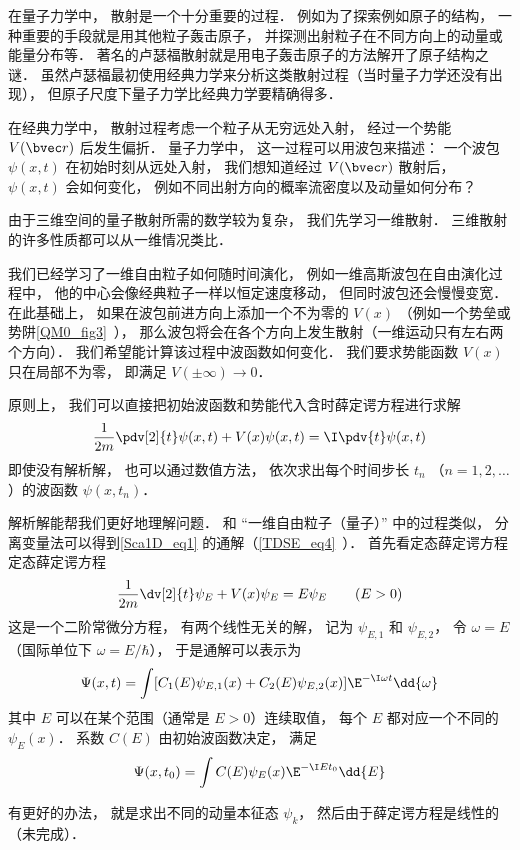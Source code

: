 
\begin{issues}
\issueDraft
\end{issues}


在量子力学中， 散射是一个十分重要的过程． 例如为了探索例如原子的结构， 一种重要的手段就是用其他粒子轰击原子， 并探测出射粒子在不同方向上的动量或能量分布等． 著名的卢瑟福散射就是用电子轰击原子的方法解开了原子结构之谜． 虽然卢瑟福最初使用经典力学来分析这类散射过程（当时量子力学还没有出现）， 但原子尺度下量子力学比经典力学要精确得多．

在经典力学中， 散射过程考虑一个粒子从无穷远处入射， 经过一个势能 $V(\bvec r)$ 后发生偏折． 量子力学中， 这一过程可以用波包来描述： 一个波包 $\psi(x, t)$ 在初始时刻从远处入射， 我们想知道经过 $V(\bvec r)$ 散射后， $\psi(x, t)$ 会如何变化， 例如不同出射方向的概率流密度以及动量如何分布？

由于三维空间的量子散射所需的数学较为复杂， 我们先学习一维散射． 三维散射的许多性质都可以从一维情况类比．

我们已经学习了一维自由粒子如何随时间演化， 例如一维高斯波包在自由演化过程中， 他的中心会像经典粒子一样以恒定速度移动， 但同时波包还会慢慢变宽． 在此基础上， 如果在波包前进方向上添加一个不为零的 $V(x)$ （例如一个势垒或势阱\autoref{QM0_fig3}~）， 那么波包将会在各个方向上发生散射（一维运动只有左右两个方向）． 我们希望能计算该过程中波函数如何变化． 我们要求势能函数 $V(x)$ 只在局部不为零， 即满足 $V(\pm\infty) \to 0$． 

原则上， 我们可以直接把初始波函数和势能代入含时薛定谔方程进行求解
\begin{equation}\label{Sca1D_eq1}
\frac{1}{2m}\pdv[2]{t}\psi(x, t) + V(x) \psi(x, t) = \I \pdv{t} \psi(x, t)
\end{equation}
即使没有解析解， 也可以通过数值方法， 依次求出每个时间步长 $t_n$ （$n = 1, 2, \dots$）的波函数 $\psi(x, t_n)$．

解析解能帮我们更好地理解问题． 和 “一维自由粒子（量子）” 中的过程类似， 分离变量法可以得到\autoref{Sca1D_eq1} 的通解（\autoref{TDSE_eq4}~）． 首先看定态薛定谔方程定态薛定谔方程
\begin{equation}
\frac{1}{2m}\dv[2]{t}\psi_E + V(x) \psi_E = E \psi_E \qquad (E > 0)
\end{equation}
这是一个二阶常微分方程， 有两个线性无关的解， 记为 $\psi_{E,1}$ 和 $\psi_{E,2}$， 令 $\omega = E$（国际单位下 $\omega = E/\hbar$）， 于是通解可以表示为
\begin{equation}
\Psi(x, t) = \int [C_1(E) \psi_{E,1}(x) + C_2(E) \psi_{E,2}(x)] \E^{-\I \omega t} \dd{\omega}
\end{equation}
其中 $E$ 可以在某个范围（通常是 $E > 0$）连续取值， 每个 $E$ 都对应一个不同的 $\psi_E(x)$． 系数 $C(E)$ 由初始波函数决定， 满足
\begin{equation}
\Psi(x, t_0) = \int C(E) \psi_E(x) \E^{-\I E t_0} \dd{E}
\end{equation}


有更好的办法， 就是求出不同的动量本征态 $\psi_k$， 然后由于薛定谔方程是线性的（未完成）．

